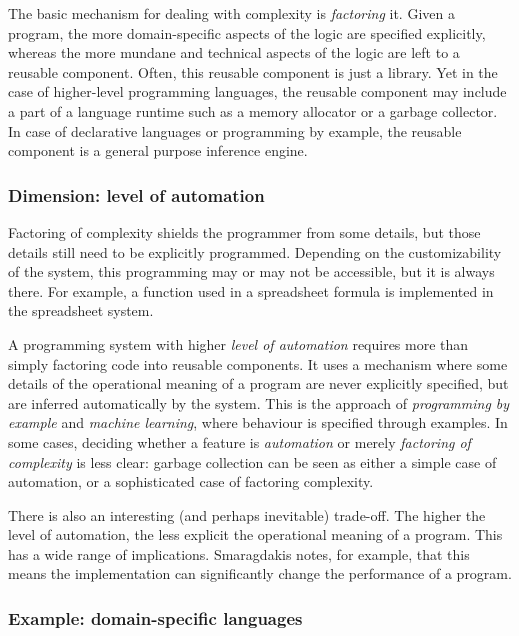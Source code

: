 \documentclass[english,submission]{programming}
\begin{document}
The basic mechanism for dealing with complexity is \emph{factoring} it.
Given a program, the more domain-specific aspects of the logic are
specified explicitly, whereas the more mundane and technical aspects of
the logic are left to a reusable component. Often, this reusable
component is just a library. Yet in the case of higher-level programming
languages, the reusable component may include a part of a language
runtime such as a memory allocator or a garbage collector. In case of
declarative languages or programming by example, the reusable component
is a general purpose inference engine.

\hypertarget{dimension-level-of-automation}{%
\subsubsection{Dimension: level of
automation}\label{dimension-level-of-automation}}

Factoring of complexity shields the programmer from some details, but
those details still need to be explicitly programmed. Depending on the
customizability of the system, this programming may or may not be
accessible, but it is always there. For example, a function used in a
spreadsheet formula is implemented in the spreadsheet system.

A programming system with higher \emph{level of automation} requires
more than simply factoring code into reusable components. It uses a
mechanism where some details of the operational meaning of a program are
never explicitly specified, but are inferred automatically by the
system. This is the approach of \emph{programming by example} and
\emph{machine learning}, where behaviour is specified through examples.
In some cases, deciding whether a feature is \emph{automation} or merely
\emph{factoring of complexity} is less clear: garbage collection can be
seen as either a simple case of automation, or a sophisticated case of
factoring complexity.

There is also an interesting (and perhaps inevitable) trade-off. The
higher the level of automation, the less explicit the operational
meaning of a program. This has a wide range of implications. Smaragdakis
\cite{NextGen} notes, for example, that this means the implementation
can significantly change the performance of a program.

\hypertarget{example-domain-specific-languages}{%
\subsubsection{Example: domain-specific
languages}\label{example-domain-specific-languages}}
\end{document}
